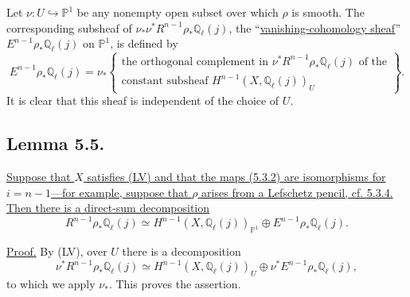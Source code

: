 Let $\nu:U\hookrightarrow\mathbb P^1$ be any nonempty open subset over
which $\rho$ is smooth.  The corresponding subsheaf of
$\nu_*\nu^*R^{n-1}\rho_*\mathbb Q_\ell(j)$, the
``\underline{vanishing-cohomology sheaf}''
$E^{n-1}\rho_*\mathbb Q_\ell(j)$ on $\mathbb P^1$, is defined by
\begin{equation}\tag{5.4.4.1}
E^{n-1}\rho_*\mathbb Q_\ell(j)
=\nu_*\left\{
\begin{array}{l}
\text{the orthogonal complement in }
\nu^*R^{n-1}\rho_*\mathbb Q_\ell(j)\text{ of the}\\[1ex]
\text{constant subsheaf }H^{n-1}(X,\mathbb Q_\ell(j))_U
\end{array}
\right\}.
\end{equation}
It is clear that this sheaf is independent of the choice of $U$.

\subsection*{Lemma 5.5.}
\underline{Suppose that $X$ satisfies (LV) and that the maps (5.3.2) are
isomorphisms for $i=n-1$---for example, suppose that $\rho$ arises from a
Lefschetz pencil, cf. 5.3.4.  Then there is a direct-sum decomposition}
\begin{equation}\tag{5.5.1}
R^{n-1}\rho_*\mathbb Q_\ell(j)
\simeq
H^{n-1}(X,\mathbb Q_\ell(j))_{\mathbb P^1}
\oplus E^{n-1}\rho_*\mathbb Q_\ell(j).
\end{equation}

\underline{Proof.}
By (LV), over $U$ there is a decomposition
\begin{equation}\tag{5.5.2}
\nu^*R^{n-1}\rho_*\mathbb Q_\ell(j)
\simeq
H^{n-1}(X,\mathbb Q_\ell(j))_U
\oplus \nu^*E^{n-1}\rho_*\mathbb Q_\ell(j),
\end{equation}
to which we apply $\nu_*$.  This proves the assertion.
